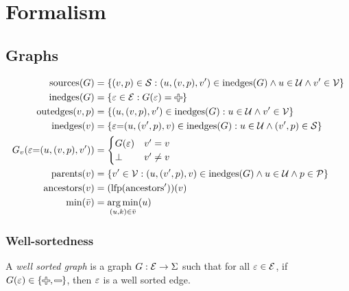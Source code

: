 \section{Formalism}
\label{sec:Formalism}


\subsection{Graphs}
\label{sec:Formalism:Graphs}

\begin{align*}
  \sources{G} &= \SetOf{(v, p) \in \S \SuchThat{
    (u, (v, p), v') \in \inedges{G} \land u \in \U \land v' \in \V}} \\
  \inedges{G} &= \SetOf{\e \in \E \SuchThat{G(\e) = \Plus}} \\
  \outedges{v}{p} &= \SetOf{(u, (v, p), v') \in \inedges{G} \SuchThat{u \in \U \land v' \in \V }} \\
  \inedges{v} &= \SetOf{\e{=}(u, (v', p), v) \in \inedges{G} \SuchThat{u \in \U \land (v', p) \in \S}} \\
  G_v(\e{=}(u, (v, p), v')) &= \begin{cases}
    G(\e) & v' = v \\
    \bot  & v' \neq v \\
  \end{cases} \\
  \parents{v} &= \SetOf{v' \in \V \SuchThat{(u, (v', p), v) \in \inedges{G} \land u \in \U \land p \in \P}} \\
  \ancestors{v} &= \mathopen{}\left( \lfp{\ancestorsPrimeOp} \right)\mathclose{}(v) \\
  \min{\Q{v}} &= \argmin{(u, k) \in \Q{v}}{u}
\end{align*}


\subsubsection{Well-sortedness}

\begin{definition}
  A \emph{well sorted graph} is a graph $G : \mathcal{E} \rightarrow \Sigma$
  such that for all $\varepsilon \in \mathcal{E}$,
  if $G(\e) \in \SetOf{\Plus, \Minus}$,
  then $\varepsilon$ is a well sorted edge. 
\end{definition}

